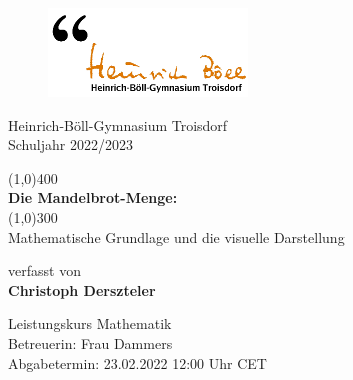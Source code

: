 \begin{center}
  \begin{figure}
    \vspace{-2cm}
    \hspace{-2cm}
    \includegraphics[scale=0.75]{images/heinrichboellgymnasium}
  \end{figure}

  \vspace{1cm}
  Heinrich-Böll-Gymnasium Troisdorf\\
  Schuljahr 2022/2023

  \vspace{1cm}
  \Huge
  \line(1,0){400}\\
  \textbf{Die Mandelbrot-Menge:}\\
  \line(1,0){300}\\

  \vspace{0.75cm}
  \Large
  Mathematische Grundlage und die visuelle Darstellung

  \vspace{2cm}
  \large
  verfasst von\\
  \Large
  \textbf{Christoph Derszteler}

  \vfill
  \large
  Leistungskurs Mathematik\\
  Betreuerin: Frau Dammers\\
  Abgabetermin: 23.02.2022 12:00 Uhr CET\\
\end{center}
\thispagestyle{empty}